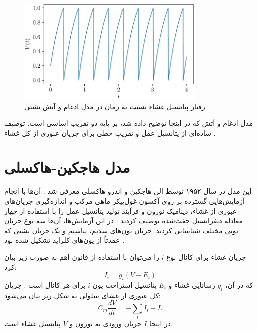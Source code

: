 \begin{figure}[!htt]
    \centering
    \includegraphics[width=0.8\textwidth]{figures/LIF}
    \caption{رفتار پتانسیل غشاء نسبت به زمان در مدل ادغام و آتش نشتی}
    \label{fig:lif}
\end{figure}

مدل ادغام و آتش که در اینجا توضیح داده شد، بر پایه دو تقریب اساسی است.
توصیف ساده‌ای از پتانسیل عمل و تقریب خطی برای جریان عبوری از کل غشاء
\cite{dayan2001}.

\section{مدل هاجکین-هاکسلی}
این مدل در سال ۱۹۵۲ توسط الن هاجکین و اندرو هاکسلی معرفی شد
\cite{hodgkin1952,hodgkin1952a,hodgkin1952b,hodgkin1952c,hodgkin1952d}.
آن‌ها با انجام آزمایش‌هایی گسترده بر روی آکسون غول‌پیکر ماهی مرکب و اندازه‌گیری جریان‌های عبوری از غشاء، دینامیک نورون و فرآیند تولید پتانسیل عمل را با استفاده از چهار معادله دیفرانسیل جفت‌شده توصیف کردند
\cite{trappenberg2022}.
در این آزمایش‌ها، آن‌ها سه نوع جریان یونی مختلف شناسایی کردند.
جریان یون‌های سدیم، پتاسیم و یک جریان نشتی که عمدتاً از یون‌های کلراید تشکیل شده بود
\cite{gerstner2002}.

جریان غشاء برای کانال نوع
\( i \)
را می‌توان با استفاده از قانون اهم به صورت زیر بیان کرد:
\begin{equation}
    I_{i} = g_{i} (V - E_{i})
\end{equation}
که در آن،
\( g_{i} \)
رسانایی غشاء و
\( E_{i} \)
پتانسیل استراحت یون
\( i \)
برای هر کانال است
\cite{trappenberg2022}.
جریان کل عبوری از غشای سلولی به شکل زیر بیان می‌شود:
\begin{equation} \label{eq:membrane_current_split}
    C_{m} \frac{dV}{dt} = -\sum_{i} I_{i} + I.
\end{equation}
در اینجا
\( I \)
جریان ورودی به نورون و
\( V \)
پتانسیل غشاء است.

